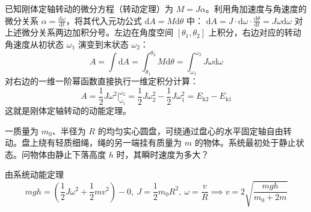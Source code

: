 \documentclass[lang=cn,11pt]{elegantbook}
\begin{document}
\begin{theorem}[刚体定轴转动的动能定理]
已知刚体定轴转动的微分方程（转动定理）为 $M = J\alpha$。利用角加速度与角速度的微分关系 $\alpha = \frac{\mathrm{d}\omega}{\mathrm{d}t}$，将其代入元功公式 $\mathrm{d}A = M\mathrm{d}\theta$ 中： \(\mathrm{d}A = J \cdot \mathrm{d}\omega \cdot \frac{\mathrm{d}\theta}{\mathrm{d}t} = J\omega \mathrm{d}\omega\) 对上述微分关系两边加积分号。左边在角度空间 $[\theta_1, \theta_2]$ 上积分，右边对应的转动角速度从初状态 $\omega_1$ 演变到末状态 $\omega_2$：$$A = \int \mathrm{d}A = \int_{\theta_1}^{\theta_2} M\mathrm{d}\theta = \int_{\omega_1}^{\omega_2} J\omega \mathrm{d}\omega$$对右边的一维一阶幂函数直接执行一维定积分计算：$$A = \frac{1}{2}J\omega^2 \Big|_{\omega_1}^{\omega_2} = \frac{1}{2}J\omega_2^2 - \frac{1}{2}J\omega_1^2 = E_{\text{k}2} - E_{\text{k}1}$$这就是刚体定轴转动的动能定理。
\end{theorem}

\begin{exercise}
一质量为 $m_0$、半径为 $R$ 的均匀实心圆盘，可绕通过盘心的水平固定轴自由转动。盘上绕有轻质细绳，绳的另一端挂有质量为 $m$ 的物体。系统最初处于静止状态。问物体由静止下落高度 $h$ 时，其瞬时速度为多大？
\end{exercise}
\begin{solution}
由系统动能定理$$mgh = \left( \frac{1}{2}J\omega^2 + \frac{1}{2}mv^2 \right) - 0 ,~J = \frac{1}{2}m_0R^2,~ \omega = \frac{v}{R}\implies v = 2\sqrt{\frac{mgh}{m_0 + 2m}}$$
\end{solution}
\end{document}
